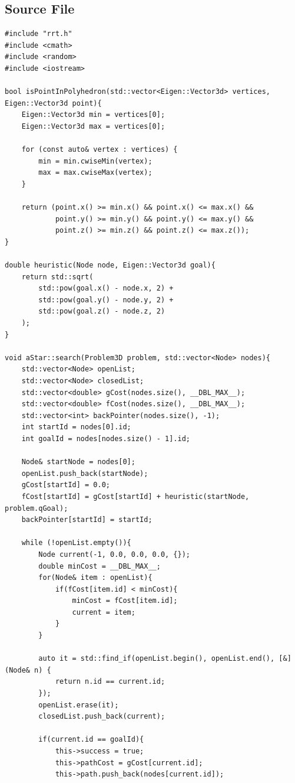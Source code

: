 \documentclass{article}
\begin{document}
\subsection*{Source File}
\begin{lstlisting}[style=cppstyle]
#include "rrt.h"
#include <cmath>
#include <random>
#include <iostream>

bool isPointInPolyhedron(std::vector<Eigen::Vector3d> vertices, Eigen::Vector3d point){
    Eigen::Vector3d min = vertices[0];
    Eigen::Vector3d max = vertices[0];

    for (const auto& vertex : vertices) {
        min = min.cwiseMin(vertex);
        max = max.cwiseMax(vertex);
    }

    return (point.x() >= min.x() && point.x() <= max.x() &&
            point.y() >= min.y() && point.y() <= max.y() &&
            point.z() >= min.z() && point.z() <= max.z());
}

double heuristic(Node node, Eigen::Vector3d goal){
    return std::sqrt(
        std::pow(goal.x() - node.x, 2) +
        std::pow(goal.y() - node.y, 2) +
        std::pow(goal.z() - node.z, 2) 
    );
}

void aStar::search(Problem3D problem, std::vector<Node> nodes){
    std::vector<Node> openList;
    std::vector<Node> closedList;
    std::vector<double> gCost(nodes.size(), __DBL_MAX__);
    std::vector<double> fCost(nodes.size(), __DBL_MAX__);
    std::vector<int> backPointer(nodes.size(), -1);
    int startId = nodes[0].id;
    int goalId = nodes[nodes.size() - 1].id;

    Node& startNode = nodes[0];
    openList.push_back(startNode);
    gCost[startId] = 0.0;
    fCost[startId] = gCost[startId] + heuristic(startNode, problem.qGoal);
    backPointer[startId] = startId;

    while (!openList.empty()){
        Node current(-1, 0.0, 0.0, 0.0, {});
        double minCost = __DBL_MAX__;
        for(Node& item : openList){
            if(fCost[item.id] < minCost){
                minCost = fCost[item.id];
                current = item;
            }
        }
        
        auto it = std::find_if(openList.begin(), openList.end(), [&](Node& n) {
            return n.id == current.id;
        });
        openList.erase(it);
        closedList.push_back(current);
        
        if(current.id == goalId){
            this->success = true;
            this->pathCost = gCost[current.id];
            this->path.push_back(nodes[current.id]);


\end{lstlisting}
\end{document}
